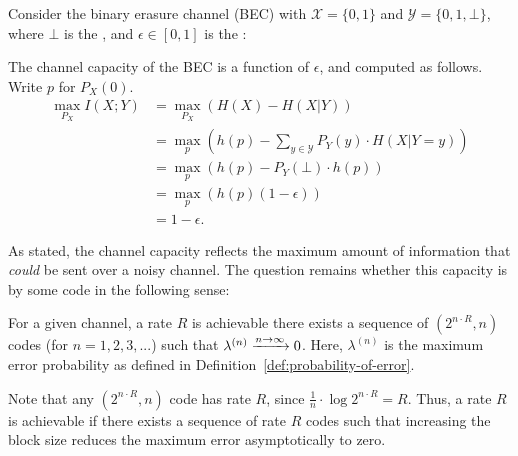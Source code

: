 \begin{example}
Consider the binary erasure channel (BEC) with $\mathcal{X} = \{0,1\}$ and $\mathcal{Y} = \{0,1,\bot\}$, where $\bot$ is the , and $\epsilon \in [0,1]$ is the :
\begin{center}
\end{center} 
The channel capacity of the BEC is a function of $\epsilon$, and computed as follows. Write $p$ for $P_X(0)$.
\begin{align*}
\max_{P_X} I(X;Y) &= \max_{P_X} \left( H(X) - H(X|Y)\right)\\
&= \max_{p} \left( h(p) - \sum_{y \in \mathcal{Y}} P_Y(y) \cdot H(X|Y=y)\right)\\
&= \max_{p} \left( h(p) - P_Y(\bot) \cdot h(p)\right)\\
&= \max_{p} \left( h(p) (1-\epsilon)\right)\\
&= 1 - \epsilon.
\end{align*}
\end{example}
As stated, the channel capacity reflects the maximum amount of information that \emph{could} be sent over a noisy channel. The question remains whether this capacity is  by some code in the following sense:

\begin{definition}
For a given channel, a rate $R$ is achievable there exists a sequence of $(2^{n \cdot R},n)$ codes (for $n = 1,2,3,...$) such that $\lambda^{(n)} \xrightarrow{n \to \infty} 0$. Here, $\lambda^{(n)}$ is the maximum error probability as defined in Definition~\ref{def:probability-of-error}.
\end{definition}
Note that any $(2^{n \cdot R},n)$ code has rate $R$, since $\frac{1}{n} \cdot \log {2^{n \cdot R}} = R$. Thus, a rate $R$ is achievable if there exists a sequence of rate $R$ codes such that increasing the block size reduces the maximum error asymptotically to zero.

